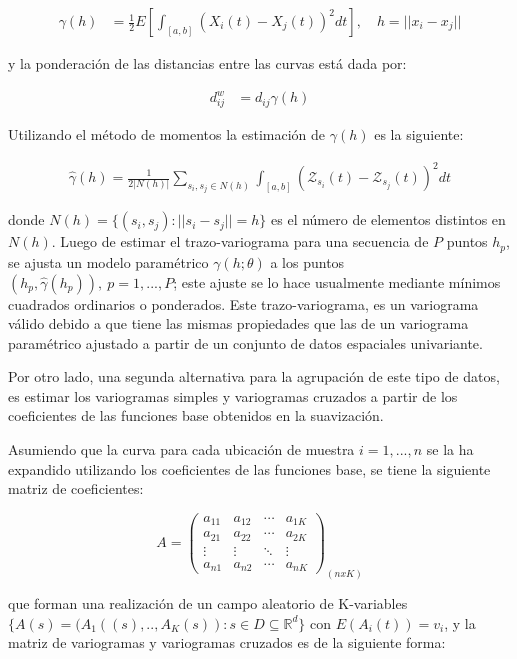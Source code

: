 \documentclass[
]{book}
\begin{document}
\begin{align*}
    \gamma(h)&=\frac{1}{2}E\left[\int_{[a,b]}(X_i(t)-X_j(t))^2dt \right],\quad h=||x_i-x_j||
\end{align*}

y la ponderación de las distancias entre las curvas está dada por:

\begin{align*}
    d_{ij}^w&=d_{ij}\gamma(h)
\end{align*}

Utilizando el método de momentos la estimación de \(\gamma(h)\) es la siguiente:

\begin{align*}
    \hat{\gamma}(h)=\frac{1}{2 |N(h)|}\sum_{s_i,s_j\in N(h)}\int_{[a,b]}(\mathcal{Z}_{s_i}(t)-\mathcal{Z}_{s_j}(t))^2dt
\end{align*}

donde \(N(h)=\{(s_i, s_j): ||s_i -s_j||=h\}\) es el número de elementos distintos en \(N(h)\). Luego de estimar el trazo-variograma para una secuencia de \(P\) puntos \(h_p\), se ajusta un modelo paramétrico \(\gamma(h;\theta)\) a los puntos \((h_p,\hat{\gamma}(h_p)),\ p=1,...,P\); este ajuste se lo hace usualmente mediante mínimos cuadrados ordinarios o ponderados. Este trazo-variograma, es un variograma válido debido a que tiene las mismas propiedades que las de un variograma paramétrico ajustado a partir de un conjunto de datos espaciales univariante.

Por otro lado, una segunda alternativa para la agrupación de este tipo de datos, es estimar los variogramas simples y variogramas cruzados a partir de los coeficientes de las funciones base obtenidos en la suavización.

Asumiendo que la curva para cada ubicación de muestra \(i=1,...,n\) se la ha expandido utilizando los coeficientes de las funciones base, se tiene la siguiente matriz de coeficientes:

\begin{equation*}
A=
\begin{pmatrix}
a_{11} & a_{12} & \cdots & a_{1K}\\
a_{21} & a_{22} & \cdots & a_{2K}\\
\vdots & \vdots & \ddots & \vdots\\
a_{n1} & a_{n2} & \cdots & a_{nK}
\end{pmatrix}_{(nxK)}
\end{equation*}

que forman una realización de un campo aleatorio de K-variables \(\{A(s)=(A_1((s),..,A_K(s)): s\in D \subseteq \mathbb{R}^d\}\) con \(E(A_i(t))=v_i\), y la matriz de variogramas y variogramas cruzados es de la siguiente forma:
\end{document}
